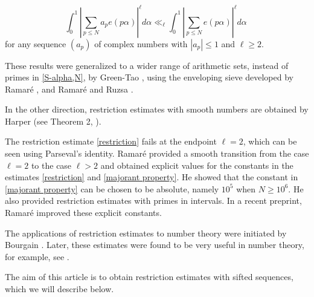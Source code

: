\documentclass[12pt,article]{amsart}
\theoremstyle{remark}
\numberwithin{equation}{section}
\begin{document}
	\begin{equation}
		\label{majorant property}
		\int_0^1\left|\sum_{p\leq N} a_pe(p\alpha)\right|^\ell d\alpha\ll_\ell \int_{0}^1\left|\sum_{p\leq N}e(p\alpha)\right|^\ell d\alpha\; 
	\end{equation}
	for any sequence $(a_p)$ of complex numbers with $|a_p|\leq 1$ and $\ell\geq 2$. 
	
	
	\vspace{2mm}
	\noindent
	These results were generalized to a wider range of arithmetic sets,  instead of primes in \eqref{S-alpha,N},  by 
	Green-Tao \cite{Green-Tao*06}, using the enveloping sieve developed by Ramar\'e \cite{Ramare*95}, and Ramar\'e and Ruzsa \cite{Ramare-ruzsa}. 
	
	\vspace{2mm}
	\noindent
	In the other direction, restriction estimates with smooth numbers are obtained by Harper (see Theorem 2, \cite{Harper*16}).
	
	
	\vspace{2mm}
	\noindent
	The restriction estimate \eqref{restriction} fails at the endpoint $\ell=2$, which can be seen using Parseval's identity. Ramar\'e \cite{ramare24} provided a smooth transition from the case $\ell=2$ to the case $\ell>2$ and obtained explicit values for the constants in the estimates \eqref{restriction} and  \eqref{majorant property}. He showed that the constant in \eqref{majorant property} can be chosen to be absolute, namely $10^5$ when $N\geq 10^6$. He also provided restriction estimates with primes in intervals. In a recent preprint, Ramar\'e \cite{Ramare*25} improved these explicit constants.  
	
	\vspace{2mm}
	\noindent
	The applications of restriction estimates to number theory were initiated by Bourgain \cite{Bourgain*89}. Later,  these estimates were found to be very useful in number theory, for example, see \cite{Green*03, Harper*16}.
	
	\vspace{2mm}
	\noindent
	The aim of this article is to obtain restriction estimates with sifted sequences, which we will describe below.
	
\end{document}
